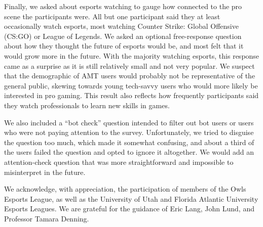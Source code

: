 \documentclass[sigconf]{acmart}
\begin{document}
Finally, we asked about esports watching to gauge how connected to the pro scene the participants were. All but one participant said they at least occasionally watch esports, most watching Counter Strike: Global Offensive (CS:GO) or League of Legends. We asked an optional free-response question about how they thought the future of esports would be, and most felt that it would grow more in the future. With the majority watching esports, this response came as a surprise as it is still relatively small and not very popular. We suspect that the demographic of AMT users would probably not be representative of the general public, skewing towards young tech-savvy users who would more likely be interested in pro gaming. This result also reflects how frequently participants said they watch professionals to learn new skills in games.

We also included a “bot check” question intended to filter out bot users or users who were not paying attention to the survey. Unfortunately, we tried to disguise the question too much, which made it somewhat confusing, and about a third of the users failed the question and opted to ignore it altogether. We would add an attention-check question that was more straightforward and impossible to misinterpret in the future. 


\begin{acks} 
    We acknowledge, with appreciation, the participation of members of the Owls Esports League, as well as the University of Utah and Florida Atlantic University Esports Leagues. We are grateful for the guidance of Eric Lang, John Lund, and Professor Tamara Denning. 
\end{acks}



\end{document}
